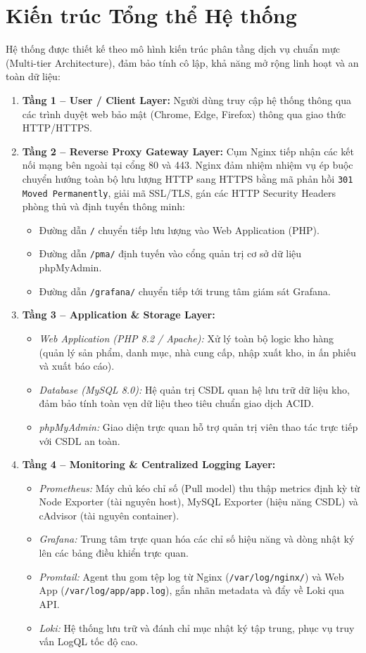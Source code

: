 \documentclass[12pt,a4paper,oneside]{report}
\begin{document}
\section{Kiến trúc Tổng thể Hệ thống}
Hệ thống được thiết kế theo mô hình kiến trúc phân tầng dịch vụ chuẩn mực (Multi-tier Architecture), đảm bảo tính cô lập, khả năng mở rộng linh hoạt và an toàn dữ liệu:
\begin{enumerate}
    \item \textbf{Tầng 1 -- User / Client Layer:} Người dùng truy cập hệ thống thông qua các trình duyệt web bảo mật (Chrome, Edge, Firefox) thông qua giao thức HTTP/HTTPS.
    \item \textbf{Tầng 2 -- Reverse Proxy Gateway Layer:} Cụm Nginx tiếp nhận các kết nối mạng bên ngoài tại cổng 80 và 443. Nginx đảm nhiệm nhiệm vụ ép buộc chuyển hướng toàn bộ lưu lượng HTTP sang HTTPS bằng mã phản hồi \texttt{301 Moved Permanently}, giải mã SSL/TLS, gán các HTTP Security Headers phòng thủ và định tuyến thông minh:
    \begin{itemize}
        \item Đường dẫn \texttt{/} chuyển tiếp lưu lượng vào Web Application (PHP).
        \item Đường dẫn \texttt{/pma/} định tuyến vào cổng quản trị cơ sở dữ liệu phpMyAdmin.
        \item Đường dẫn \texttt{/grafana/} chuyển tiếp tới trung tâm giám sát Grafana.
    \end{itemize}
    \item \textbf{Tầng 3 -- Application \& Storage Layer:}
    \begin{itemize}
        \item \textit{Web Application (PHP 8.2 / Apache):} Xử lý toàn bộ logic kho hàng (quản lý sản phẩm, danh mục, nhà cung cấp, nhập xuất kho, in ấn phiếu và xuất báo cáo).
        \item \textit{Database (MySQL 8.0):} Hệ quản trị CSDL quan hệ lưu trữ dữ liệu kho, đảm bảo tính toàn vẹn dữ liệu theo tiêu chuẩn giao dịch ACID.
        \item \textit{phpMyAdmin:} Giao diện trực quan hỗ trợ quản trị viên thao tác trực tiếp với CSDL an toàn.
    \end{itemize}
    \item \textbf{Tầng 4 -- Monitoring \& Centralized Logging Layer:}
    \begin{itemize}
        \item \textit{Prometheus:} Máy chủ kéo chỉ số (Pull model) thu thập metrics định kỳ từ Node Exporter (tài nguyên host), MySQL Exporter (hiệu năng CSDL) và cAdvisor (tài nguyên container).
        \item \textit{Grafana:} Trung tâm trực quan hóa các chỉ số hiệu năng và dòng nhật ký lên các bảng điều khiển trực quan.
        \item \textit{Promtail:} Agent thu gom tệp log từ Nginx (\texttt{/var/log/nginx/}) và Web App (\texttt{/var/log/app/app.log}), gắn nhãn metadata và đẩy về Loki qua API.
        \item \textit{Loki:} Hệ thống lưu trữ và đánh chỉ mục nhật ký tập trung, phục vụ truy vấn LogQL tốc độ cao.
    \end{itemize}
\end{enumerate}
\end{document}
